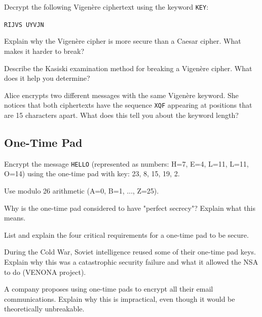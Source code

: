 \documentclass[11pt,a4paper]{report}
\begin{document}
\begin{ex}
Decrypt the following Vigenère ciphertext using the keyword \texttt{KEY}:

\texttt{RIJVS UYVJN}
\end{ex}

\begin{ex}
Explain why the Vigenère cipher is more secure than a Caesar cipher. What makes it harder to break?
\end{ex}

\begin{ex}
Describe the Kasiski examination method for breaking a Vigenère cipher. What does it help you determine?
\end{ex}

\begin{ex}
Alice encrypts two different messages with the same Vigenère keyword. She notices that both ciphertexts have the sequence \texttt{XQF} appearing at positions that are 15 characters apart. What does this tell you about the keyword length?
\end{ex}

\subsection{One-Time Pad}

\begin{ex}
Encrypt the message \texttt{HELLO} (represented as numbers: H=7, E=4, L=11, L=11, O=14) using the one-time pad with key: 23, 8, 15, 19, 2.

Use modulo 26 arithmetic (A=0, B=1, ..., Z=25).
\end{ex}

\begin{ex}
Why is the one-time pad considered to have "perfect secrecy"? Explain what this means.
\end{ex}

\begin{ex}
List and explain the four critical requirements for a one-time pad to be secure.
\end{ex}

\begin{ex}
During the Cold War, Soviet intelligence reused some of their one-time pad keys. Explain why this was a catastrophic security failure and what it allowed the NSA to do (VENONA project).
\end{ex}

\begin{ex}
A company proposes using one-time pads to encrypt all their email communications. Explain why this is impractical, even though it would be theoretically unbreakable.
\end{ex}
\end{document}
